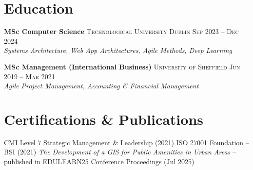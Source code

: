 \documentclass{simpleresume}
\begin{document}
\section{Education}
\noindent\textbf{MSc Computer Science}
  \hfill{\sffamily\scshape\small\color{secondary}Technological University Dublin}
  \hfill{\sffamily\scshape\small\color{muted}Sep 2023 -- Dec 2024}\\
  {\itshape\color{secondary}Systems Architecture, Web App Architectures, Agile Methods, Deep Learning}

\vspace{0.05cm}
\noindent\textbf{MSc Management (International Business)}
  \hfill{\sffamily\scshape\small\color{secondary}University of Sheffield}
  \hfill{\sffamily\scshape\small\color{muted}Jun 2019 -- Mar 2021}\\
  {\itshape\color{secondary}Agile Project Management, Accounting \& Financial Management}

\section{Certifications \& Publications}
\noindent
{\sffamily\small\color{secondary}
  CMI Level 7 Strategic Management \& Leadership (2021) \quad\textbullet\quad
  ISO 27001 Foundation -- BSI (2021) \quad\textbullet\quad
  \textit{The Development of a GIS for Public Amenities in Urban Areas} -- published in EDULEARN25 Conference Proceedings (Jul 2025)
}
\end{document}
